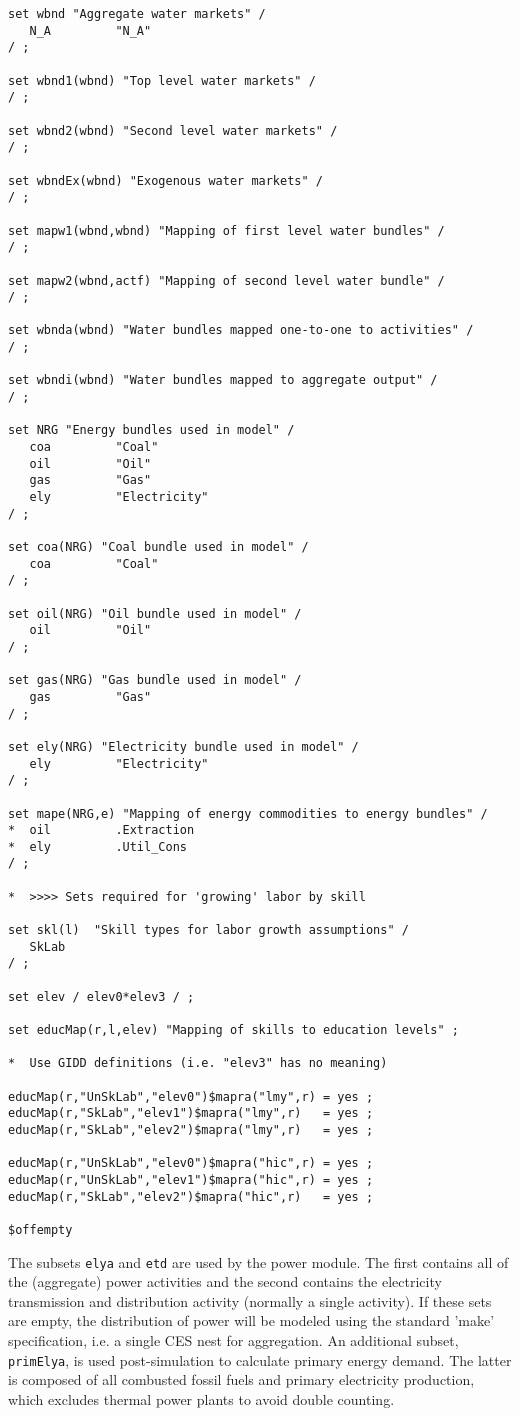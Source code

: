\begin{lstlisting}[language=GAMS, caption={Sets for the \textsc{Envisage} Model aggregation}, label=lst:EnvSets]
set wbnd "Aggregate water markets" /
   N_A         "N_A"
/ ;

set wbnd1(wbnd) "Top level water markets" /
/ ;

set wbnd2(wbnd) "Second level water markets" /
/ ;

set wbndEx(wbnd) "Exogenous water markets" /
/ ;

set mapw1(wbnd,wbnd) "Mapping of first level water bundles" /
/ ;

set mapw2(wbnd,actf) "Mapping of second level water bundle" /
/ ;

set wbnda(wbnd) "Water bundles mapped one-to-one to activities" /
/ ;

set wbndi(wbnd) "Water bundles mapped to aggregate output" /
/ ;

set NRG "Energy bundles used in model" /
   coa         "Coal"
   oil         "Oil"
   gas         "Gas"
   ely         "Electricity"
/ ;

set coa(NRG) "Coal bundle used in model" /
   coa         "Coal"
/ ;

set oil(NRG) "Oil bundle used in model" /
   oil         "Oil"
/ ;

set gas(NRG) "Gas bundle used in model" /
   gas         "Gas"
/ ;

set ely(NRG) "Electricity bundle used in model" /
   ely         "Electricity"
/ ;

set mape(NRG,e) "Mapping of energy commodities to energy bundles" /
*  oil         .Extraction
*  ely         .Util_Cons
/ ;

*  >>>> Sets required for 'growing' labor by skill

set skl(l)  "Skill types for labor growth assumptions" /
   SkLab
/ ;

set elev / elev0*elev3 / ;

set educMap(r,l,elev) "Mapping of skills to education levels" ;

*  Use GIDD definitions (i.e. "elev3" has no meaning)

educMap(r,"UnSkLab","elev0")$mapra("lmy",r) = yes ;
educMap(r,"SkLab","elev1")$mapra("lmy",r)   = yes ;
educMap(r,"SkLab","elev2")$mapra("lmy",r)   = yes ;

educMap(r,"UnSkLab","elev0")$mapra("hic",r) = yes ;
educMap(r,"UnSkLab","elev1")$mapra("hic",r) = yes ;
educMap(r,"SkLab","elev2")$mapra("hic",r)   = yes ;

$offempty
\end{lstlisting}

The subsets \texttt{elya} and \texttt{etd} are used by the power module.
The first contains all of the (aggregate) power activities and the second
contains the electricity transmission and distribution activity (normally a
single activity). If these sets are empty, the distribution of power will be
modeled using the standard 'make' specification, i.e. a single CES nest for
aggregation. An additional subset, \texttt{primElya}, is used post-simulation to
calculate primary energy demand. The latter is composed of all combusted fossil
fuels and primary electricity production, which excludes thermal power plants to
avoid double counting.

